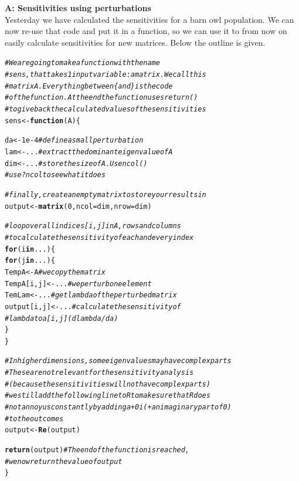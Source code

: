 \documentclass{article}\usepackage[]{graphicx}\usepackage[]{color}
\makeatletter
\newcommand{\hlnum}[1]{\textcolor[rgb]{0.686,0.059,0.569}{#1}}%
\newcommand{\hlcom}[1]{\textcolor[rgb]{0.678,0.584,0.686}{\textit{#1}}}%
\newcommand{\hlstd}[1]{\textcolor[rgb]{0.345,0.345,0.345}{#1}}%
\newcommand{\hlkwa}[1]{\textcolor[rgb]{0.161,0.373,0.58}{\textbf{#1}}}%
\newcommand{\hlkwb}[1]{\textcolor[rgb]{0.69,0.353,0.396}{#1}}%
\newcommand{\hlkwc}[1]{\textcolor[rgb]{0.333,0.667,0.333}{#1}}%
\newcommand{\hlkwd}[1]{\textcolor[rgb]{0.737,0.353,0.396}{\textbf{#1}}}%
\newenvironment{kframe}{%
 \def\at@end@of@kframe{}%
 \ifinner\ifhmode%
  \def\at@end@of@kframe{\end{minipage}}%
  \begin{minipage}{\columnwidth}%
 \fi\fi%
 \def\FrameCommand##1{\hskip\@totalleftmargin \hskip-\fboxsep
 \colorbox{shadecolor}{##1}\hskip-\fboxsep
     \hskip-\linewidth \hskip-\@totalleftmargin \hskip\columnwidth}%
 \MakeFramed {\advance\hsize-\width
   \@totalleftmargin\z@ \linewidth\hsize
   \@setminipage}}%
 {\par\unskip\endMakeFramed%
 \at@end@of@kframe}
\newenvironment{knitrout}{}{} %
\makeatother
\begin{document}
\begin{mdframed}\textbf{A: Sensitivities using perturbations}\\
Yesterday we have calculated the sensitivities for a barn owl population. We can now re-use that code and put it in a function, so we can use it to from now on easily calculate sensitivities for new matrices. Below the outline is given.

\begin{knitrout}
\color{fgcolor}\begin{kframe}
\begin{alltt}
\hlcom{# We are going to make a function with the name}
\hlcom{# sens, that takes 1 input variable: a matrix. We call this}
\hlcom{# matrix A. Everything between \{ and \} is the code}
\hlcom{# of the function. At the end the function uses return()}
\hlcom{# to give back the calculated values of the sensitivities}
\hlstd{sens} \hlkwb{<-} \hlkwa{function}\hlstd{(}\hlkwc{A}\hlstd{)\{}

  \hlstd{da} \hlkwb{<-} \hlnum{1e-4} \hlcom{# define a small perturbation}
  \hlstd{lam} \hlkwb{<-} \hlstd{...}  \hlcom{# extract the dominant eigenvalue of A}
  \hlstd{dim} \hlkwb{<-} \hlstd{...} \hlcom{# store the size of A. Use ncol()}
             \hlcom{# use ?ncol to see what it does}

  \hlcom{# finally, create an empty matrix to store your results in}
  \hlstd{output} \hlkwb{<-} \hlkwd{matrix}\hlstd{(}\hlnum{0}\hlstd{,}\hlkwc{ncol}\hlstd{=dim,}\hlkwc{nrow}\hlstd{=dim)}

  \hlcom{# loop over all indices [i,j] in A, rows and columns}
  \hlcom{# to calculate the sensitivity of each and every index}
  \hlkwa{for}\hlstd{(i} \hlkwa{in} \hlstd{...)\{}
    \hlkwa{for}\hlstd{(j} \hlkwa{in} \hlstd{...)\{}
      \hlstd{TempA} \hlkwb{<-} \hlstd{A} \hlcom{# we copy the matrix}
      \hlstd{TempA[i,j]} \hlkwb{<-} \hlstd{...} \hlcom{# we perturb one element}
      \hlstd{TemLam} \hlkwb{<-} \hlstd{...} \hlcom{# get lambda of the perturbed matrix}
      \hlstd{output[i,j]} \hlkwb{<-} \hlstd{...} \hlcom{# calculate the sensitivity of }
                         \hlcom{#lambda to a[i,j] (dlambda/da)}
    \hlstd{\}}
  \hlstd{\}}

  \hlcom{# In higher dimensions, some eigenvalues may have complex parts}
  \hlcom{# These are not relevant for the sensitivity analysis }
  \hlcom{# (because the sensitivities will not have complex parts)}
  \hlcom{# we still add the following line to R to make sure that R does}
  \hlcom{# not annoy us constantly by adding a +0i (+ an imaginary part of 0)}
  \hlcom{# to the outcomes}
  \hlstd{output} \hlkwb{<-} \hlkwd{Re}\hlstd{(output)}

  \hlkwd{return}\hlstd{(output)} \hlcom{# The end of the function is reached, }
                 \hlcom{# we now return the value of output}
\hlstd{\}}
\end{alltt}
\end{kframe}
\end{knitrout}
\end{mdframed}
\end{document}
